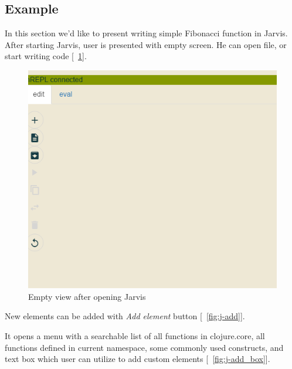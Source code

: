 \documentclass[11pt]{scrartcl}
\newcommand*{\figref}[1]{[\textbf{\figurename}~\ref{#1}]}
\begin{document}
\subsection{Example}
In this section we'd like to present writing simple Fibonacci function in Jarvis.
After starting Jarvis, user is presented with empty screen. He can open file, or
start writing code \figref{fig:j-startup}. 

\begin{figure}[hbt]
  \centering
  \includegraphics[scale=0.3]{img/j-startup}
  \caption{Empty view after opening Jarvis}
\label{fig:j-startup}
\end{figure}

New elements can be added with \textit{Add element} button \figref{fig:j-add}.

It opens a menu with a searchable list of all functions in clojure.core, all
functions defined in current namespace, some commonly used constructs, and text
box which user can utilize to add custom elements \figref{fig:j-add_box}.
\end{document}
